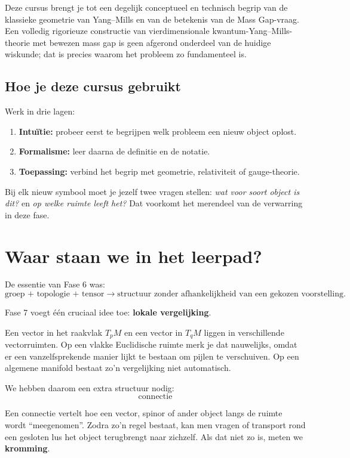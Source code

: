 \documentclass[11pt,a4paper]{article}
\begin{document}
\begin{waarschuwing}
Deze cursus brengt je tot een degelijk conceptueel en technisch begrip van de klassieke geometrie van Yang--Mills en van de betekenis van de Mass Gap-vraag. Een volledig rigorieuze constructie van vierdimensionale kwantum-Yang--Mills-theorie met bewezen mass gap is geen afgerond onderdeel van de huidige wiskunde; dat is precies waarom het probleem zo fundamenteel is.
\end{waarschuwing}

\subsection*{Hoe je deze cursus gebruikt}
Werk in drie lagen:
\begin{enumerate}
    \item \textbf{Intuïtie:} probeer eerst te begrijpen welk probleem een nieuw object oplost.
    \item \textbf{Formalisme:} leer daarna de definitie en de notatie.
    \item \textbf{Toepassing:} verbind het begrip met geometrie, relativiteit of gauge-theorie.
\end{enumerate}

Bij elk nieuw symbool moet je jezelf twee vragen stellen: \emph{wat voor soort object is dit?} en \emph{op welke ruimte leeft het?} Dat voorkomt het merendeel van de verwarring in deze fase.

\section{Waar staan we in het leerpad?}

De essentie van Fase 6 was:
\[
\text{groep + topologie + tensor} \longrightarrow \text{structuur zonder afhankelijkheid van een gekozen voorstelling}.
\]

Fase 7 voegt één cruciaal idee toe: \textbf{lokale vergelijking}.

Een vector in het raakvlak $T_pM$ en een vector in $T_qM$ liggen in verschillende vectorruimten. Op een vlakke Euclidische ruimte merk je dat nauwelijks, omdat er een vanzelfsprekende manier lijkt te bestaan om pijlen te verschuiven. Op een algemene manifold bestaat zo'n vergelijking niet automatisch.

We hebben daarom een extra structuur nodig:
\[
\boxed{\text{connectie}}
\]

Een connectie vertelt hoe een vector, spinor of ander object langs de ruimte wordt ``meegenomen''. Zodra zo'n regel bestaat, kan men vragen of transport rond een gesloten lus het object terugbrengt naar zichzelf. Als dat niet zo is, meten we \textbf{kromming}.
\end{document}
